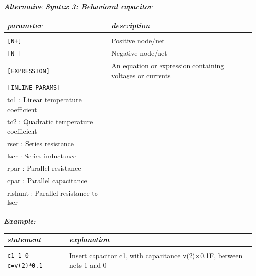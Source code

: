 { 

\textbf{\textit{Alternative Syntax 3: Behavioral capacitor}}


\begin{longtable}{l l}
\textit{parameter} & \textit{description} \\ \hline \\ \vspace{-0.8\parskip}
\texttt{[N+]} & Positive node/net \\
\texttt{[N-]} & Negative node/net \\
\texttt{[EXPRESSION]} & An equation or expression containing voltages or currents \\
\texttt{[INLINE PARAMS]} & \begin{tabular}{lp{5.5cm}p{5cm}}\textit{Inline parameters :} \\ 
																					{\small tc1 : Linear temperature coefficient} \\
																					{\small tc2 : Quadratic temperature coefficient} \\
																					{\small rser : Series resistance} \\
																					{\small lser : Series inductance} \\ 
																					{\small rpar : Parallel resistance} \\
																					{\small cpar : Parallel capacitance} \\
																					{\small rlshunt : Parallel resistance to lser}
																					\end{tabular}  																	
\end{longtable}

\textbf{\textit{Example:}}

\begin{longtable}{l l}
\textit{statement} & \textit{explanation} \\ \hline \\ %
		\texttt{c1 1 0 c={v(2)*0.1}} 
			& {\small Insert capacitor c1, with capacitance v(2)$\times$0.1F, between nets 1 and 0} 
\end{longtable}
}

